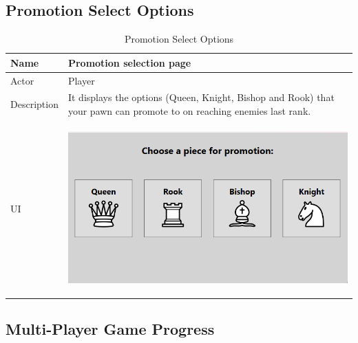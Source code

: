 \documentclass[a4paper,12pt]{article}
\begin{document}
\subsection{Promotion Select Options}

\begin{longtable}{|m{}|m{}|}
    \caption{Promotion Select Options} \\
    \hline
    Name & Promotion selection page \\
    \hline
    Actor & Player \\
    \hline
    Description & It displays the options (Queen, Knight, Bishop and Rook) that your pawn can promote to on reaching enemies last rank.\\ 
    \hline
    \centering UI & 
    \begin{center}
        \includegraphics[height=2.3in]{Images/Use Cases/promotionSelectOptions.png}
    \end{center} \\ 
    \hline
\end{longtable}

\subsection{Multi-Player Game Progress}
\end{document}
